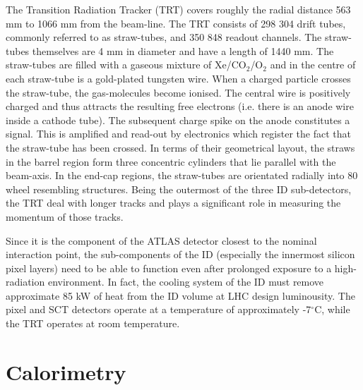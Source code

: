 The Transition Radiation Tracker (TRT) covers roughly the radial distance 563 mm to 1066 mm from the beam-line. The TRT consists of 298 304 drift tubes, commonly referred to as straw-tubes, and 350 848 readout channels. The straw-tubes themselves are 4 mm in diameter and have a length of 1440 mm. The straw-tubes are filled with a gaseous mixture of Xe/CO$_{2}$/O$_{2}$ and in the centre of each straw-tube is a gold-plated tungsten wire. When a charged particle crosses the straw-tube, the gas-molecules become ionised. The central wire is positively charged and thus attracts the resulting free electrons (i.e. there is an anode wire inside a cathode tube). The subsequent charge spike on the anode constitutes a signal. This is amplified and read-out by electronics which register the fact that the straw-tube has been crossed. In terms of their geometrical layout, the straws in the barrel region form three concentric cylinders that lie parallel with the beam-axis. In the end-cap regions, the straw-tubes are orientated radially into 80 wheel resembling structures. Being the outermost of the three ID sub-detectors, the TRT deal with longer tracks and plays a significant role in measuring the momentum of those tracks.

Since it is the component of the ATLAS detector closest to the nominal interaction point, the sub-components of the ID (especially the innermost silicon pixel layers) need to be able to function even after prolonged exposure to a high-radiation environment. In fact, the cooling system of the ID must remove approximate 85 kW of heat from the ID volume at LHC design luminousity. The pixel and SCT detectors operate at a temperature of approximately -7$^{\circ}$C, while the TRT operates at room temperature.
\section{Calorimetry}
\label{calorimetry}
